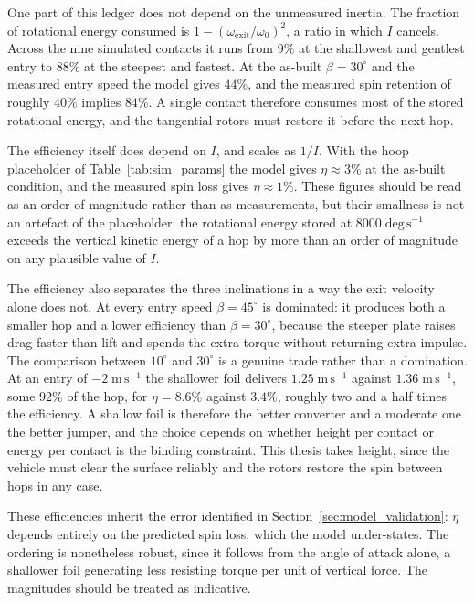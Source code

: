 One part of this ledger does not depend on the unmeasured inertia.  The
fraction of rotational energy consumed is
$1 - (\omega_{\mathrm{exit}}/\omega_0)^{2}$, a ratio in which $I$ cancels.
Across the nine simulated contacts it runs from $9\%$ at the shallowest and
gentlest entry to $88\%$ at the steepest and fastest.  At the as-built
$\beta = 30^{\circ}$ and the measured entry speed the model gives $44\%$, and
the measured spin retention of roughly $40\%$ implies $84\%$.  A single contact
therefore consumes most of the stored rotational energy, and the tangential
rotors must restore it before the next hop.

The efficiency itself does depend on $I$, and scales as $1/I$.  With the hoop
placeholder of Table~\ref{tab:sim_params} the model gives $\eta \approx 3\%$ at
the as-built condition, and the measured spin loss gives $\eta \approx 1\%$.
These figures should be read as an order of magnitude rather than as
measurements, but their smallness is not an artefact of the placeholder: the
rotational energy stored at $8000\;\mathrm{deg\,s^{-1}}$ exceeds the vertical
kinetic energy of a hop by more than an order of magnitude on any plausible
value of $I$.

The efficiency also separates the three inclinations in a way the exit velocity
alone does not.  At every entry speed $\beta = 45^{\circ}$ is dominated: it
produces both a smaller hop and a lower efficiency than $\beta = 30^{\circ}$,
because the steeper plate raises drag faster than lift and spends the extra
torque without returning extra impulse.  The comparison between $10^{\circ}$
and $30^{\circ}$ is a genuine trade rather than a domination.  At an entry of
$-2\;\mathrm{m\,s^{-1}}$ the shallower foil delivers
$1.25\;\mathrm{m\,s^{-1}}$ against $1.36\;\mathrm{m\,s^{-1}}$, some $92\%$ of
the hop, for $\eta = 8.6\%$ against $3.4\%$, roughly two and a half times the
efficiency.  A shallow foil is therefore the better converter and a moderate
one the better jumper, and the choice depends on whether height per contact or
energy per contact is the binding constraint.  This thesis takes height, since
the vehicle must clear the surface reliably and the rotors restore the spin
between hops in any case.

These efficiencies inherit the error identified in
Section~\ref{sec:model_validation}: $\eta$ depends entirely on the predicted
spin loss, which the model under-states.  The ordering is nonetheless robust,
since it follows from the angle of attack alone, a shallower foil generating
less resisting torque per unit of vertical force.  The magnitudes should be
treated as indicative.

